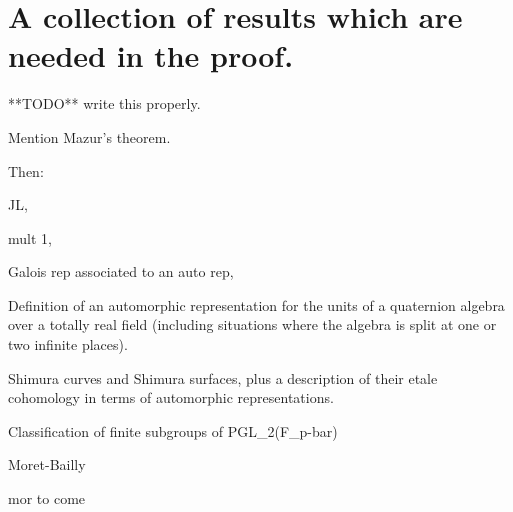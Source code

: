 \chapter{A collection of results which are needed in the proof.}

**TODO** write this properly.

Mention Mazur's theorem.

Then: 

JL, 

mult 1, 

Galois rep associated to an auto rep, 

Definition of an automorphic representation for the units of a quaternion algebra over a totally real field (including situations where the algebra is split at one or two infinite places).

Shimura curves and Shimura surfaces, plus a description of their etale cohomology in terms of automorphic representations.

Classification of finite subgroups of PGL_2(F_p-bar)

Moret-Bailly

mor to come
